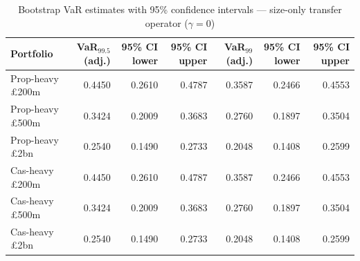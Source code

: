 \begin{table}[htbp]
\centering
\caption{Bootstrap VaR estimates with 95\% confidence intervals --- size-only transfer operator ($\gamma=0$)}
\label{tab:bootstrap_var}
\begin{tabular}{lrrrrrr}
\toprule
\textbf{Portfolio} & \textbf{VaR$_{99.5}$ (adj.)} & \textbf{95\% CI lower} & \textbf{95\% CI upper} & \textbf{VaR$_{99}$ (adj.)} & \textbf{95\% CI lower} & \textbf{95\% CI upper} \\
\midrule
Prop-heavy £200m & 0.4450 & 0.2610 & 0.4787 & 0.3587 & 0.2466 & 0.4553 \\
Prop-heavy £500m & 0.3424 & 0.2009 & 0.3683 & 0.2760 & 0.1897 & 0.3504 \\
Prop-heavy £2bn & 0.2540 & 0.1490 & 0.2733 & 0.2048 & 0.1408 & 0.2599 \\
Cas-heavy £200m & 0.4450 & 0.2610 & 0.4787 & 0.3587 & 0.2466 & 0.4553 \\
Cas-heavy £500m & 0.3424 & 0.2009 & 0.3683 & 0.2760 & 0.1897 & 0.3504 \\
Cas-heavy £2bn & 0.2540 & 0.1490 & 0.2733 & 0.2048 & 0.1408 & 0.2599 \\
\bottomrule
\end{tabular}
\end{table}
